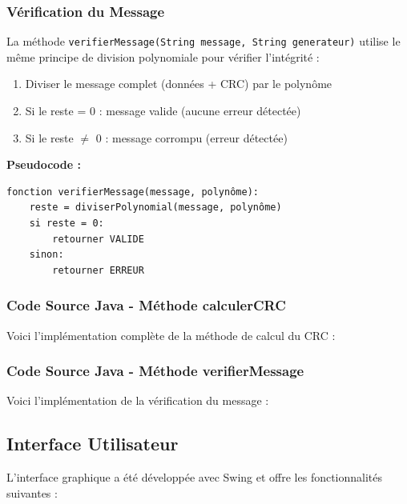 \documentclass[12pt, a4paper]{article}
\begin{document}
\subsubsection{Vérification du Message}

La méthode \texttt{verifierMessage(String message, String generateur)} utilise le même principe de division polynomiale pour vérifier l'intégrité :

\begin{enumerate}
    \item Diviser le message complet (données + CRC) par le polynôme
    \item Si le reste = 0 : message valide (aucune erreur détectée)
    \item Si le reste $\neq$ 0 : message corrompu (erreur détectée)
\end{enumerate}

\textbf{Pseudocode :}
\begin{verbatim}
fonction verifierMessage(message, polynôme):
    reste = diviserPolynomial(message, polynôme)
    si reste = 0:
        retourner VALIDE
    sinon:
        retourner ERREUR
\end{verbatim}

\subsubsection{Code Source Java - Méthode calculerCRC}

Voici l'implémentation complète de la méthode de calcul du CRC :



\subsubsection{Code Source Java - Méthode verifierMessage}

Voici l'implémentation de la vérification du message :



\subsection{Interface Utilisateur}

L'interface graphique a été développée avec Swing et offre les fonctionnalités suivantes :
\end{document}
